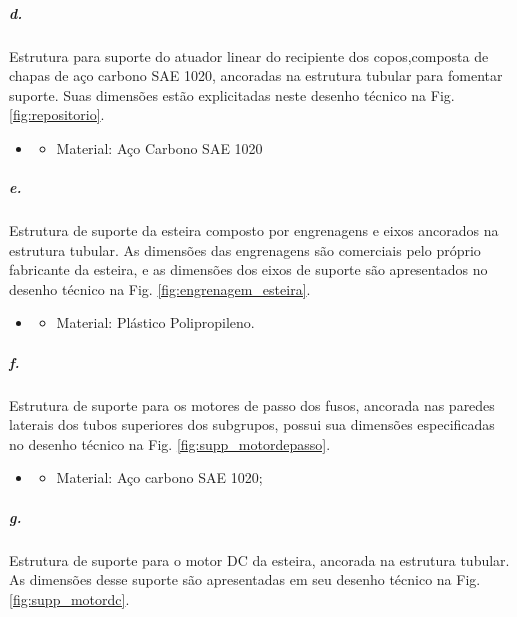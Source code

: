      
    
   \subparagraph*{d.} \label{retorno_suporte_atuador}  
   Estrutura para suporte do atuador linear do recipiente dos copos,composta de chapas de aço carbono SAE 1020, ancoradas na estrutura tubular para fomentar suporte. 
    Suas dimensões estão explicitadas neste desenho técnico na Fig. \ref{fig:repositorio}.
    
   \begin{itemize}
   \item[]
   \begin{itemize}
       \item Material: Aço Carbono SAE 1020
   \end{itemize}
   \end{itemize}

    
     
    \subparagraph*{e.} \label{retorno_suporte_esteira}
    Estrutura de suporte da esteira composto por engrenagens e eixos ancorados na estrutura tubular. As dimensões das engrenagens são comerciais pelo próprio fabricante da esteira, e as dimensões dos eixos de suporte são apresentados no desenho técnico na Fig. \ref{fig:engrenagem_esteira}.

    \begin{itemize}
   \item[]
   \begin{itemize}
       \item Material: Plástico Polipropileno.
   \end{itemize}
   \end{itemize}
     
    
    
    \subparagraph*{f.} \label{retorno_suporte_motordepasso}
    Estrutura de suporte para os motores de passo dos fusos, ancorada nas paredes laterais dos tubos superiores dos subgrupos, possui sua dimensões especificadas no desenho técnico na Fig. \ref{fig:supp_motordepasso}.
    
    \begin{itemize}
   \item[]
   \begin{itemize}
       \item Material: Aço carbono SAE 1020;
   \end{itemize}
   \end{itemize}
     
    
    
    \subparagraph*{g.} \label{Retorno_suporte_motorDC}
    Estrutura de suporte para o motor DC da esteira, ancorada na estrutura tubular. As dimensões desse suporte são apresentadas em seu desenho técnico na Fig. \ref{fig:supp_motordc}.
    

